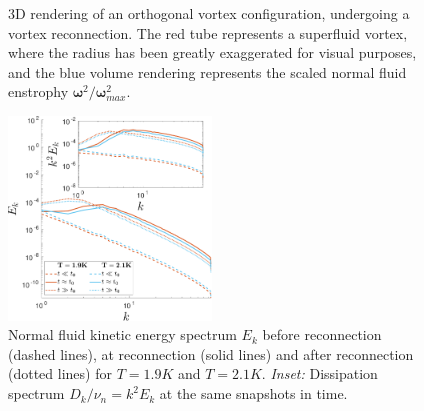 \documentclass[%
 reprint,
 amsmath,amssymb,
 aps,
 prl,
]{revtex4-2}
\newcommand{\bom}{\boldsymbol{\omega}}
\begin{document}
\begin{figure}
\begin{subfigure}[b]{0.24\textwidth}
	\end{subfigure}
    \hfill
	\caption{3D rendering of an orthogonal vortex configuration, undergoing a vortex reconnection. The red tube represents a superfluid vortex, where the radius has been greatly exaggerated for visual purposes, and the blue volume rendering represents the scaled normal fluid enstrophy $\bom^2/\bom^2_{max}$.}
\end{figure}

\blindtext[3]

\begin{figure}
    \centering
    \includegraphics*[width=0.48\textwidth]{energy-spec.pdf}
    \caption{Normal fluid kinetic energy spectrum $E_k$ before reconnection (dashed lines), at reconnection (solid lines) and after reconnection (dotted lines) for $T=1.9K$ and $T=2.1K$. \emph{Inset:} Dissipation spectrum $D_k/\nu_n=k^2 E_k$ at the same snapshots in time.}
\end{figure}

\blindtext[3] 
\end{document}
